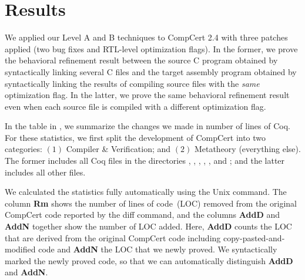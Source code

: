 \section{Results}

\newcommand{\specialcell}[2][c]{%
  \begin{tabular}[#1]{@{}c@{}}#2\end{tabular}}

We applied our Level A and B techniques to CompCert 2.4 with three
patches applied (two bug fixes and RTL-level optimization flags).
In the former, we prove the behavioral refinement result between the
source C program obtained by syntactically linking several C files and
the target assembly program obtained by syntactically linking the
results of compiling source files with the \emph{same} optimization
flag.  In the latter, we prove the same behavioral refinement result
even when each source file is compiled with a different optimization
flag.

\begin{landscape}
\end{landscape}

In the table in , we summarize the changes we
made in number of lines of Coq.  For these statistics, we first split
the development of CompCert into two categories: $(1)$ Compiler \&
Verification; and $(2)$ Metatheory (\ie everything else). The former
includes all Coq files in the directories ,
, , , , and
; and the latter includes all other files.

We calculated the statistics fully automatically using the Unix
 command. The column \textbf{Rm} shows the number of
lines of code~(LOC) removed from the original CompCert code reported
by the diff command, and the columns \textbf{AddD} and \textbf{AddN}
together show the number of LOC added.  Here,
\textbf{AddD} counts the LOC that are derived from the original
CompCert code including copy-pasted-and-modified code and \textbf{AddN}
the LOC that we newly proved. We syntactically marked the newly proved
code, so that we can automatically distinguish
\textbf{AddD} and \textbf{AddN}.


